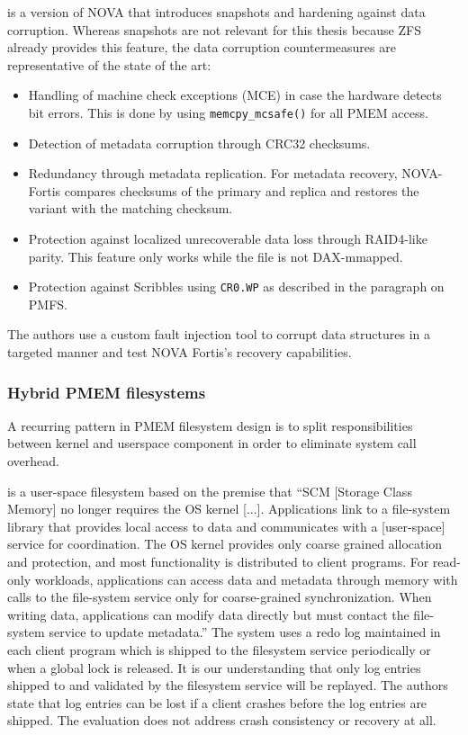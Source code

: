 \documentclass[12pt,a4paper,twoside]{book}
\begin{document}
 is a version of NOVA that introduces snapshots and hardening against data corruption.
Whereas snapshots are not relevant for this thesis because ZFS already provides this feature, the data corruption countermeasures are representative of the state of the art:
\begin{itemize}[noitemsep,beginpenalty=100000,midpenalty=100000]
    \item Handling of machine check exceptions (MCE) in case the hardware detects bit errors.
          This is done by using \lstinline{memcpy_mcsafe()} for all PMEM access.
    \item Detection of metadata corruption through CRC32 checksums.
    \item Redundancy through metadata replication. For metadata recovery, NOVA-Fortis compares checksums of the primary and replica and restores the variant with the matching checksum.
    \item Protection against localized unrecoverable data loss through RAID4-like parity.
          This feature only works while the file is not DAX-mmapped.
    \item Protection against Scribbles using \lstinline{CR0.WP} as described in the paragraph on PMFS.
\end{itemize}
The authors use a custom fault injection tool to corrupt data structures in a targeted manner and test NOVA Fortis's recovery capabilities.

\subsubsection{Hybrid PMEM filesystems}\label{sec:hybrid_pmem_file_systems}
A recurring pattern in PMEM filesystem design is to split responsibilities between kernel and userspace component in order to eliminate system call overhead.

 is a user-space filesystem based on the premise that
“SCM [Storage Class Memory] no longer requires the OS kernel [...].
Applications link to a file-system library that provides local access to data and communicates with a [user-space] service for coordination.
The OS kernel provides only coarse grained allocation and protection, and most functionality is distributed to client programs.
For read-only workloads, applications can access data and metadata through memory with calls to the file-system service only for coarse-grained synchronization.
When writing data, applications can modify data directly but must contact the file-system service to update metadata.”
The system uses a redo log maintained in each client program which is shipped to the filesystem service periodically or when a global lock is released.
It is our understanding that only log entries shipped to and validated by the filesystem service will be replayed.
The authors state that log entries can be lost if a client crashes before the log entries are shipped.
The evaluation does not address crash consistency or recovery at all.
\end{document}
